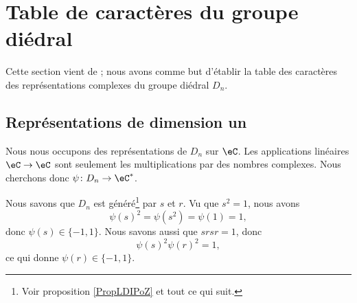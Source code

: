 \section{Table de caractères du groupe diédral}
\label{SecWMzheKf}
Cette section vient de \cite{KXjFWKA}; nous avons comme but d'établir la table des caractères des représentations complexes du groupe diédral \( D_n\).

\subsection{Représentations de dimension un}

Nous nous occupons des représentations de \( D_n\) sur \( \eC\). Les applications linéaires \( \eC\to \eC\) sont seulement les multiplications par des nombres complexes. Nous cherchons donc \( \psi\colon D_n\to \eC^*\).

Nous savons que \( D_n\) est généré\footnote{Voir proposition \ref{PropLDIPoZ} et tout ce qui suit.} par \( s\) et \( r\). Vu que \( s^2=1\), nous avons
\begin{equation}
    \psi(s)^2=\psi(s^2)=\psi(1)=1,
\end{equation}
donc \( \psi(s)\in\{ -1,1 \}\). Nous savons aussi que \( srsr=1\), donc
\begin{equation}
    \psi(s)^2\psi(r)^2=1,
\end{equation}
ce qui donne \( \psi(r)\in\{ -1,1 \}\).

